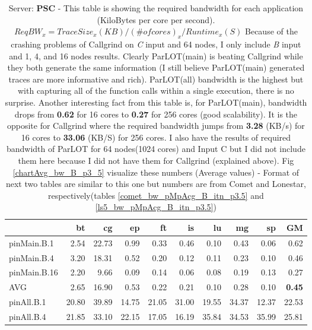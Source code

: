 \begin{table}[]


\caption{Server: \textbf{PSC} - This table is showing the required bandwidth for each application (KiloBytes per core per second). $ReqBW_x = TraceSize_x (KB) / (\# of cores)_x / Runtime_x (S)$
Because of the crashing problems of Callgrind on \textit{C} input and 64 nodes, I only include \textit{B} input and 1, 4, and 16 nodes results. Clearly ParLOT(main) is beating Callgrind while they both generate the same information (I still believe ParLOT(main) generated traces are more informative and rich). ParLOT(all) bandwidth is the highest but with capturing all of the function calls within a single execution, there is no surprise. Another interesting fact from this table is, for ParLOT(main), bandwidth drops from \textbf{0.62} for 16 cores to \textbf{0.27} for 256 cores (good scalability). It is the opposite for Callgrind where the required bandwidth jumps from \textbf{3.28} (KB/s) for 16 cores to \textbf{33.06} (KB/S) for 256 cores. I also have the results of required bandwidth of ParLOT for 64 nodes(1024 cores) and Input C but I did not include them here because I did not have them for Callgrind (explained above).  Fig \ref{chartAvg_bw_B_p3_5} visualize these numbers (Average values) - Format of next two tables are similar to this one but numbers are from Comet and Lonestar, respectively(tables \ref{comet_bw_pMpAcg_B_itn_p3.5} and \ref{ls5_bw_pMpAcg_B_itn_p3.5})}
\label{bw_pMpAcg_B_itn_p3.5}
\begin{center}
\begin{tabular}{|l|rrrrrrrr|r|}
\hline
                &    bt &    cg &    ep &    ft &    is &    lu &    mg &    sp &    GM \\
\hline
 pinMain.B.1    &  2.54 & 22.73 &  0.99 &  0.33 &  0.46 &  0.10 &  0.43 &  0.06 &  0.62 \\
 pinMain.B.4    &  3.20 & 18.31 &  0.52 &  0.20 &  0.12 &  0.11 &  0.23 &  0.10 &  0.46 \\
 pinMain.B.16   &  2.20 &  9.66 &  0.09 &  0.14 &  0.06 &  0.08 &  0.19 &  0.13 &  0.27 \\
 \hline
 AVG            &  2.65 & 16.90 &  0.53 &  0.22 &  0.21 &  0.10 &  0.28 &  0.10 &  \textbf{0.45} \\
 \hline
 pinAll.B.1     & 20.80 & 39.89 & 14.75 & 21.05 & 31.00 & 19.55 & 34.37 & 12.37 & 22.53 \\
 pinAll.B.4     & 21.85 & 33.10 & 22.15 & 17.05 & 16.19 & 35.84 & 34.53 & 35.99 & 25.81 \\

\end{tabular}
\end{center}
\end{table}
